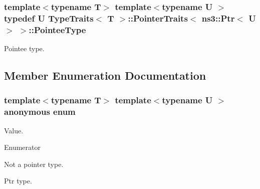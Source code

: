 \subsubsection[{\texorpdfstring{Pointee\+Type}{PointeeType}}]{\setlength{\rightskip}{0pt plus 5cm}template$<$typename T$>$ template$<$typename U $>$ typedef U {\bf Type\+Traits}$<$ T $>$\+::{\bf Pointer\+Traits}$<$ {\bf ns3\+::\+Ptr}$<$ U $>$ $>$\+::{\bf Pointee\+Type}}\hypertarget{structTypeTraits_1_1PointerTraits_3_01ns3_1_1Ptr_3_01U_01_4_01_4_aab9f49309d936b304922e6a80083126b}{}\label{structTypeTraits_1_1PointerTraits_3_01ns3_1_1Ptr_3_01U_01_4_01_4_aab9f49309d936b304922e6a80083126b}
Pointee type. 

\subsection{Member Enumeration Documentation}
\subsubsection[{\texorpdfstring{anonymous enum}{anonymous enum}}]{\setlength{\rightskip}{0pt plus 5cm}template$<$typename T$>$ template$<$typename U $>$ anonymous enum}\hypertarget{structTypeTraits_1_1PointerTraits_3_01ns3_1_1Ptr_3_01U_01_4_01_4_a54d8da47ad5bb02b8af0b2a95d5a3597}{}\label{structTypeTraits_1_1PointerTraits_3_01ns3_1_1Ptr_3_01U_01_4_01_4_a54d8da47ad5bb02b8af0b2a95d5a3597}
Value. \begin{Desc}
\item[Enumerator]\par
\begin{description}
\item[{\em 
Is\+Pointer\hypertarget{structTypeTraits_1_1PointerTraits_3_01ns3_1_1Ptr_3_01U_01_4_01_4_a54d8da47ad5bb02b8af0b2a95d5a3597a65017526e1da76dc0083f526b9263ede}{}\label{structTypeTraits_1_1PointerTraits_3_01ns3_1_1Ptr_3_01U_01_4_01_4_a54d8da47ad5bb02b8af0b2a95d5a3597a65017526e1da76dc0083f526b9263ede}
}]Not a pointer type. \item[{\em 
Is\+Ptr\hypertarget{structTypeTraits_1_1PointerTraits_3_01ns3_1_1Ptr_3_01U_01_4_01_4_a54d8da47ad5bb02b8af0b2a95d5a3597a0c3ce85112b5ec9aed69e63e6abe7b66}{}\label{structTypeTraits_1_1PointerTraits_3_01ns3_1_1Ptr_3_01U_01_4_01_4_a54d8da47ad5bb02b8af0b2a95d5a3597a0c3ce85112b5ec9aed69e63e6abe7b66}
}]Ptr type. \end{description}
\end{Desc}

